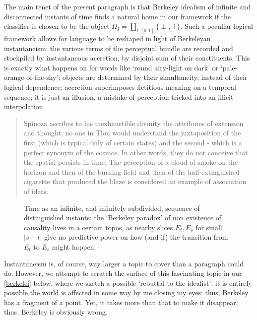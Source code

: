 \begin{example}\label{incendiata}
  The main tenet of the present paragraph is that Berkeley idealism of infinite and disconnected instants of time finds a natural home in our framework if the classifier is chosen to be the object $\Omega_I = \coprod_{t : [0,1]} \{ \perp,\top\}$. Such a peculiar logical framework allows for language to be reshaped in light of Berkeleyan instantaneism: the various terms of the perceptual bundle are recorded and stockpiled by instantaneous accretion, by disjoint sum of their constituents. This is exactly what happens on \tlon for words like `round airy-light on dark' or `pale-orange-of-the-sky'; objects are determined by their simultaneity, instead of their logical dependence: accretion superimposes fictitious meaning on a temporal sequence; it is just an illusion, a mistake of perception tricked into an illicit interpolation.
  \begin{quote}
    \hspace{.5em} Spinoza ascribes to his inexhaustible divinity the attributes of extension and thought; no one in Tlön would understand the juxtaposition of the first (which is typical only of certain states) and the second - which is a perfect synonym of the cosmos. In other words, they do not conceive that the spatial persists in time. The perception of a cloud of smoke on the horizon and then of the burning field and then of the half-extinguished cigarette that produced the blaze is considered an example of association of ideas.   \hfill\cite{tlonEN}
  \end{quote}
  \begin{center}
    \begin{figure}[h]
      \caption{Time as an infinite, and infinitely subdivided, sequence of distinguished instants: the `Berkeley paradox' of non existence of causality lives in a certain topos, as nearby slices $E_t, E_s$ for small $|s-t|$ give no predictive power on how (and if) the transition from $E_t$ to $E_s$ might happen.}
      \label{fig:berkeley}
    \end{figure}
  \end{center}
\end{example}
Instantaneism is, of course, way larger a topic to cover than a paragraph could do. However, we attempt to scratch the surface of this fascinating topic in our \autoref{berkelei} below, where we sketch a possible `rebuttal to the idealist': it is entirely possible the world is affected in some way by me closing my eyes: thus, Berkeley has a fragment of a point. Yet, it takes more than that to make it disappear; thus, Berkeley is obviously wrong.

